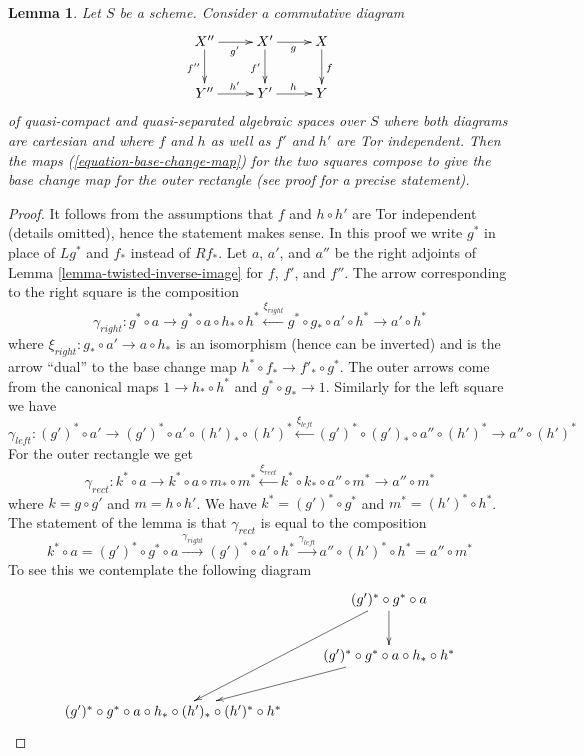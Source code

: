 \documentclass{stacks-project}
\theoremstyle{plain}
\newtheorem{lemma}[subsection]{Lemma}
\theoremstyle{definition}
\theoremstyle{remark}
\numberwithin{equation}{subsection}
\begin{document}
\begin{lemma}
\label{lemma-compose-base-change-maps-horizontal}
Let $S$ be a scheme. Consider a commutative diagram
$$
\xymatrix{
X'' \ar[r]_{g'} \ar[d]_{f''} & X' \ar[r]_g \ar[d]_{f'} & X \ar[d]^f \\
Y'' \ar[r]^{h'} & Y' \ar[r]^h & Y
}
$$
of quasi-compact and quasi-separated algebraic spaces over $S$ where
both diagrams are cartesian and where $f$ and $h$
as well as $f'$ and $h'$ are Tor independent.
Then the maps (\ref{equation-base-change-map})
for the two squares compose to give the base
change map for the outer rectangle (see proof for a precise statement).
\end{lemma}

\begin{proof}
It follows from the assumptions that $f$ and $h \circ h'$ are Tor
independent (details omitted), hence the statement makes sense.
In this proof we write $g^*$ in place of $Lg^*$ and $f_*$ instead
of $Rf_*$. Let $a$, $a'$, and $a''$ be the right adjoints of
Lemma \ref{lemma-twisted-inverse-image}
for $f$, $f'$, and $f''$. The arrow corresponding to the right
square is the composition
$$
\gamma_{right} :
g^* \circ a \to g^* \circ a \circ h_* \circ h^*
\xleftarrow{\xi_{right}} g^* \circ g_* \circ a' \circ h^* \to a' \circ h^*
$$
where $\xi_{right} : g_* \circ a' \to a \circ h_*$
is an isomorphism (hence can be inverted)
and is the arrow ``dual'' to the base change map
$h^* \circ f_* \to f'_* \circ g^*$. The outer arrows come
from the canonical maps $1 \to h_* \circ h^*$ and $g^* \circ g_* \to 1$.
Similarly for the left square we have
$$
\gamma_{left} :
(g')^* \circ a' \to (g')^* \circ a' \circ (h')_* \circ (h')^*
\xleftarrow{\xi_{left}}
(g')^* \circ (g')_* \circ a'' \circ (h')^* \to a'' \circ (h')^*
$$
For the outer rectangle we get
$$
\gamma_{rect} :
k^* \circ a \to
k^* \circ a \circ m_* \circ m^* \xleftarrow{\xi_{rect}}
k^* \circ k_* \circ a'' \circ m^* \to
a'' \circ m^*
$$
where $k = g \circ g'$ and $m = h \circ h'$.
We have $k^* = (g')^* \circ g^*$ and $m^* = (h')^* \circ h^*$.
The statement of the lemma is that $\gamma_{rect}$
is equal to the composition
$$
k^* \circ a =
(g')^* \circ g^* \circ a \xrightarrow{\gamma_{right}}
(g')^* \circ a' \circ h^* \xrightarrow{\gamma_{left}}
a'' \circ (h')^* \circ h^* = a'' \circ m^*
$$
To see this we contemplate the following diagram
$$
\xymatrix{
& (g')^* \circ g^* \circ a \ar[d] \ar[ddl] \\
& (g')^* \circ g^* \circ a \circ h_* \circ h^* \ar[ld] \\
(g')^* \circ g^* \circ a \circ h_* \circ (h')_* \circ (h')^* \circ h^* &
}$$
\end{proof}
\end{document}
